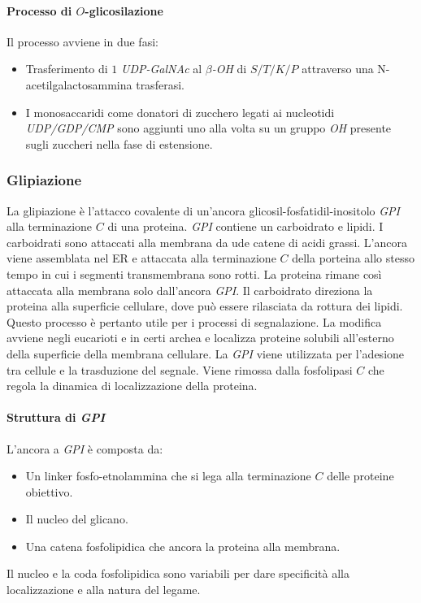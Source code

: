 			\paragraph{Processo di $O$-glicosilazione}
			Il processo avviene in due fasi:
			\begin{itemize}
				\item Trasferimento di $1$ \emph{UDP-GalNAc} al \emph{$\beta$-OH} di $S/T/K/P$ attraverso una N-acetilgalactosammina trasferasi.
				\item I monosaccaridi come donatori di zucchero legati ai nucleotidi \emph{UDP/GDP/CMP} sono aggiunti uno alla volta su un gruppo \emph{OH} presente sugli zuccheri nella fase di estensione.
			\end{itemize}

		\subsubsection{Glipiazione}
		La glipiazione \`e l'attacco covalente di un'ancora glicosil-fosfatidil-inositolo \emph{GPI} alla terminazione $C$ di una proteina. 
		\emph{GPI} contiene un carboidrato e lipidi. 
		I carboidrati sono attaccati alla membrana da ude catene di acidi grassi. 
		L'ancora viene assemblata nel ER e attaccata alla terminazione $C$ della porteina allo stesso tempo in cui i segmenti transmembrana sono rotti. 
		La proteina rimane cos\`i attaccata alla membrana solo dall'ancora \emph{GPI}.
		Il carboidrato direziona la proteina alla superficie cellulare, dove pu\`o essere rilasciata da rottura dei lipidi. 
		Questo processo \`e pertanto utile per i processi di segnalazione.
		La modifica avviene negli eucarioti e in certi archea e localizza proteine solubili all'esterno della superficie della membrana cellulare.
		La \emph{GPI} viene utilizzata per l'adesione tra cellule e la trasduzione del segnale.
		Viene rimossa dalla fosfolipasi $C$ che regola la dinamica di localizzazione della proteina.

			\paragraph{Struttura di \emph{GPI}}
			L'ancora a \emph{GPI} \`e composta da:
			\begin{itemize}
				\item Un linker fosfo-etnolammina che si lega alla terminazione $C$ delle proteine obiettivo.
				\item Il nucleo del glicano.
				\item Una catena fosfolipidica che ancora la proteina alla membrana.
			\end{itemize}
			Il nucleo e la coda fosfolipidica sono variabili per dare specificit\`a alla localizzazione e alla natura del legame.

